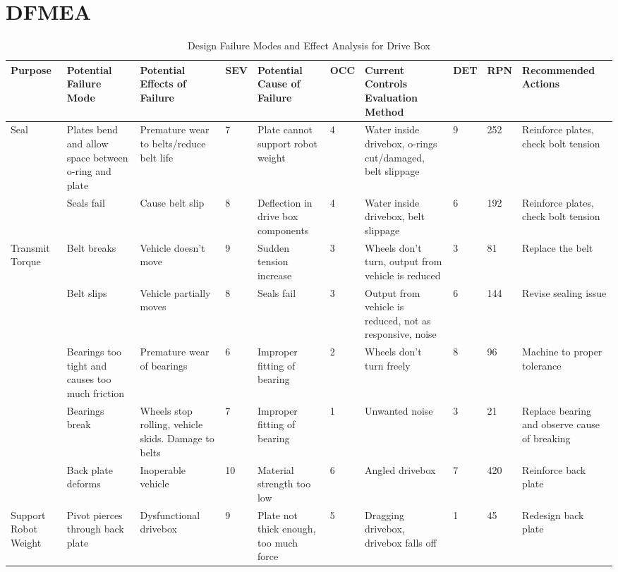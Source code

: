 \section{DFMEA} \label{dfmea}

\begin{landscape}
\begin{table}
\caption[DFMEA]{Design Failure Modes and Effect Analysis for Drive Box}
\footnotesize
\begin{tabular}{| p{1.5cm}|p{3cm}p{3cm}p{0.5cm}p{3cm}p{0.5cm}p{3.5cm}p{0.5cm}p{0.5cm}p{3cm} |} \hline
Purpose & Potential Failure Mode & Potential Effects of Failure & SEV & Potential Cause of Failure & OCC & Current Controls Evaluation Method & DET & RPN & Recommended Actions \\ \hline
\multirow{2}{1.5cm}{Seal} & Plates bend and allow space between o-ring and plate & Premature wear to belts/reduce belt life & 7 & Plate cannot support robot weight & 4 & Water inside drivebox, o-rings cut/damaged, belt slippage & 9 & 252 & Reinforce plates, check bolt tension \\
& Seals fail & Cause belt slip  & 8 & Deflection in drive box components & 4 & Water inside drivebox, belt slippage & 6 & 192 & Reinforce plates, check bolt tension \\ \hline
\multirow{5}{1.5cm}{Transmit Torque} & Belt breaks & Vehicle doesn't move & 9 & Sudden tension increase & 3 & Wheels don't turn, output from vehicle is reduced & 3 & 81 & Replace the belt  \\
 & Belt slips & Vehicle partially moves & 8 & Seals fail & 3 & Output from vehicle is reduced, not as responsive, noise & 6 & 144 & Revise sealing issue \\
 & Bearings too tight and causes too much friction & Premature wear of bearings & 6 & Improper fitting of bearing & 2 & Wheels don't turn freely & 8 & 96 & Machine to proper tolerance \\
 & Bearings break & Wheels stop rolling, vehicle skids. Damage to belts & 7 & Improper fitting of bearing & 1 & Unwanted noise & 3 & 21 & Replace bearing and observe cause of breaking \\
 & Back plate deforms & Inoperable vehicle & 10 & Material strength too low & 6 & Angled drivebox & 7 & 420 & Reinforce back plate \\ \hline
\multirow{5}{1.5cm}{Support Robot Weight} & Pivot pierces through back plate & Dysfunctional drivebox & 9 & Plate not thick enough, too much force & 5 & Dragging drivebox, drivebox falls off & 1 & 45 & Redesign back plate \\

\end{tabular}
\end{table}
\end{landscape}
